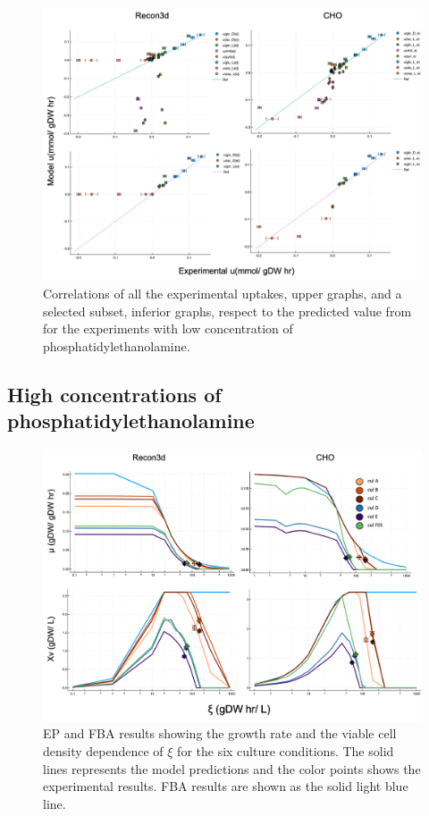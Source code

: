 \documentclass[]{article}
\begin{document}
	\begin{figure}[!h]
		\includegraphics[scale = 0.5]{low_medium_2}
		\caption{Correlations of all the experimental uptakes, upper graphs, and a selected subset, inferior graphs, respect to the predicted value from for the experiments with low concentration of phosphatidylethanolamine.}
		
	\end{figure}

	\subsection{High concentrations of phosphatidylethanolamine} %
		
	\begin{figure}[h]
		\includegraphics[scale = 0.5]{rich_medium_1}
		\caption{EP and FBA results showing the growth rate and the viable cell density dependence of $\xi$ for the six culture conditions. The solid lines represents the model predictions and the color points shows the experimental results. FBA results are shown as the solid light blue line.}
		
	\end{figure}
\end{document}
